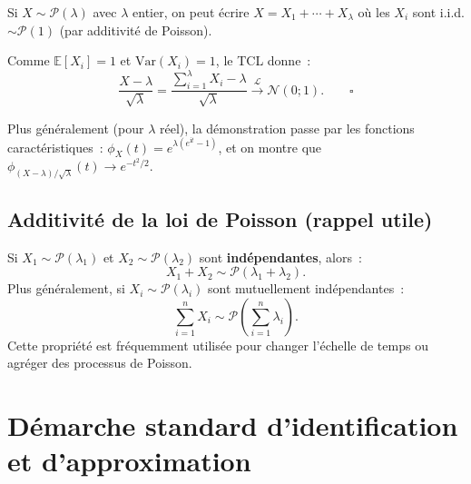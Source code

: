 \documentclass[11pt,a4paper]{article}
\newcommand{\E}{\mathbb{E}}
\newcommand{\Var}{\mathrm{Var}}
\begin{document}
\begin{demobox}
Si $X \sim \mathcal{P}(\lambda)$ avec $\lambda$ entier, on peut \'ecrire $X = X_1 + \cdots + X_\lambda$ o\`u les $X_i$ sont i.i.d. $\sim \mathcal{P}(1)$ (par additivit\'e de Poisson).

Comme $\E[X_i]=1$ et $\Var(X_i)=1$, le TCL donne~:
$$\frac{X - \lambda}{\sqrt{\lambda}} = \frac{\sum_{i=1}^\lambda X_i - \lambda}{\sqrt{\lambda}} \xrightarrow{\;\mathcal{L}\;} \mathcal{N}(0;1). \qquad\square$$

Plus g\'en\'eralement (pour $\lambda$ r\'eel), la d\'emonstration passe par les fonctions caract\'eristiques~: $\phi_X(t) = e^{\lambda(e^{\mathrm{i}t}-1)}$, et on montre que $\phi_{(X-\lambda)/\sqrt{\lambda}}(t)\to e^{-t^2/2}$.
\end{demobox}

\subsection{Additivit\'e de la loi de Poisson (rappel utile)}

\begin{thmbox}
Si $X_1 \sim \mathcal{P}(\lambda_1)$ et $X_2 \sim \mathcal{P}(\lambda_2)$ sont \textbf{ind\'ependantes}, alors~:
$$X_1 + X_2 \sim \mathcal{P}(\lambda_1 + \lambda_2).$$
Plus g\'en\'eralement, si $X_i \sim \mathcal{P}(\lambda_i)$ sont mutuellement ind\'ependantes~:
$$\sum_{i=1}^n X_i \sim \mathcal{P}\!\left(\sum_{i=1}^n \lambda_i\right).$$
Cette propri\'et\'e est fr\'equemment utilis\'ee pour changer l'\'echelle de temps ou agr\'eger des processus de Poisson.
\end{thmbox}

\section{D\'emarche standard d'identification et d'approximation}
\end{document}
